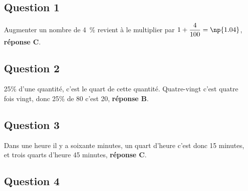 \subsection*{Question 1}



Augmenter un nombre de 4~\% revient à le multiplier par \mbox{$1+\dfrac{4}{100}=\np{1.04}$}, \textbf{réponse C}.
















\subsection*{Question 2}



















25\% d'une quantité, c'est le quart de cette quantité. Quatre-vingt c'est quatre fois vingt, donc 25\% de 80 c'est 20, \textbf{réponse B}.
\subsection*{Question 3}



















Dans une heure il y a soixante minutes, un quart d'heure c'est donc 15 minutes, et trois quarts d'heure 45 minutes, \textbf{réponse C}.
\subsection*{Question 4}



















